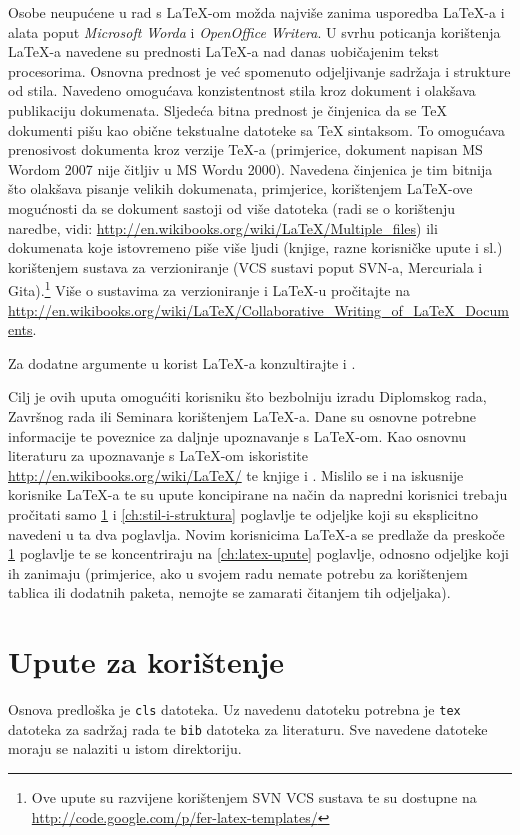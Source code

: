 \documentclass{zavrsni}
\begin{document}
Osobe neupućene u rad s \LaTeX-om možda najviše zanima usporedba \LaTeX-a i alata
poput \emph{Microsoft Worda} i \emph{OpenOffice Writera}. U svrhu poticanja
korištenja \LaTeX-a navedene su prednosti \LaTeX-a nad danas uobičajenim tekst
procesorima. Osnovna prednost je već spomenuto odjeljivanje sadržaja i strukture
od stila. Navedeno omogućava konzistentnost stila kroz dokument i olakšava
publikaciju dokumenata. Sljedeća bitna prednost je činjenica da se \TeX{}
dokumenti pišu kao obične tekstualne datoteke sa \TeX{} sintaksom. To omogućava
prenosivost dokumenta kroz verzije \TeX-a (primjerice, dokument napisan MS Wordom
2007 nije čitljiv u MS Wordu 2000). Navedena činjenica je tim bitnija što
olakšava pisanje velikih dokumenata, primjerice, korištenjem \LaTeX-ove
mogućnosti da se dokument sastoji od više datoteka (radi se o korištenju
\verb|| naredbe, vidi:
\url{http://en.wikibooks.org/wiki/LaTeX/Multiple_files})
ili dokumenata koje istovremeno piše više ljudi (knjige, razne korisničke upute i
sl.) korištenjem sustava za verzioniranje (VCS sustavi poput SVN-a, Mercuriala i
Gita).\footnote{Ove upute su razvijene korištenjem SVN VCS sustava te su dostupne
na \url{http://code.google.com/p/fer-latex-templates/}} Više o sustavima za
verzioniranje i \LaTeX-u pročitajte na
\url{http://en.wikibooks.org/wiki/LaTeX/Collaborative_Writing_of_LaTeX_Documents}.

Za dodatne argumente u korist \LaTeX-a konzultirajte \citep{taraborelli2009beauty}
i \citep{cottrell1999word}.

Cilj je ovih uputa omogućiti korisniku što bezbolniju izradu Diplomskog rada, Završnog
rada ili Seminara korištenjem \LaTeX-a. Dane su osnovne potrebne informacije te poveznice
za daljnje upoznavanje s \LaTeX-om. Kao osnovnu literaturu za upoznavanje s \LaTeX-om
iskoristite \url{http://en.wikibooks.org/wiki/LaTeX/} te knjige \citep{oetiket2007lshort}
i \citep{ungar2002uvod}. Mislilo se i na iskusnije korisnike \LaTeX-a te su upute koncipirane
na način da napredni korisnici trebaju pročitati samo \ref{ch:upute} i
\ref{ch:stil-i-struktura} poglavlje te odjeljke koji su eksplicitno navedeni u ta dva poglavlja.
Novim korisnicima \LaTeX-a se predlaže da preskoče \ref{ch:upute} poglavlje te se koncentriraju
na \ref{ch:latex-upute} poglavlje, odnosno odjeljke koji ih zanimaju (primjerice, ako
u svojem radu nemate potrebu za korištenjem tablica ili dodatnih paketa, nemojte se zamarati
čitanjem tih odjeljaka).


\chapter{Upute za korištenje}
\label{ch:upute}
Osnova predloška je \texttt{cls} datoteka. Uz navedenu datoteku potrebna
je \texttt{tex} datoteka za sadržaj rada te \texttt{bib} datoteka za literaturu. Sve
navedene datoteke moraju se nalaziti u istom direktoriju.
\end{document}
